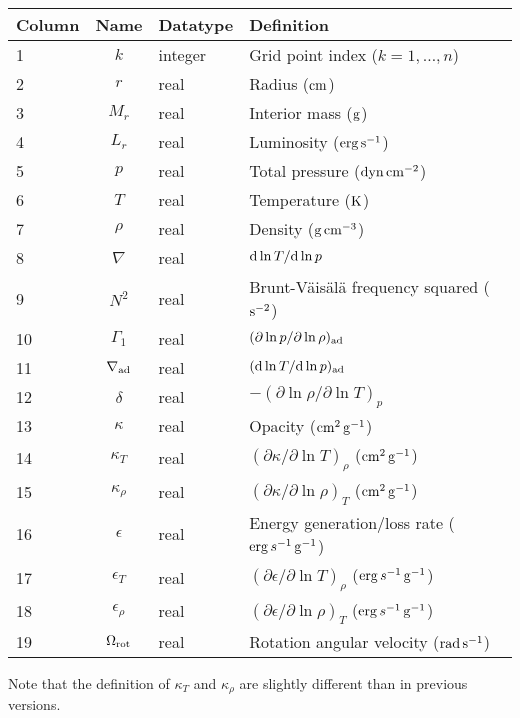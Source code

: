 \documentclass{article}
\newcommand{\diff}{\ensuremath{{\rm d}}}
\newcommand{\cm}{\ensuremath{{\rm cm}}}
\newcommand{\gram}{\ensuremath{{\rm g}}}
\newcommand{\second}{\ensuremath{{\rm s}}}
\newcommand{\dyne}{\ensuremath{{\rm dyn}}}
\newcommand{\erg}{\ensuremath{{\rm erg}}}
\newcommand{\kelvin}{\ensuremath{{\rm K}}}
\begin{document}
\begin{table}[h!]
\begin{tabular}{|l|c|l|l|} \hline
Column & Name & Datatype & Definition \\ \hline
1      & $k$ & integer & Grid point index ($k=1,\ldots,n$) \\
2      & $r$ & real    & Radius ($\cm$) \\
3      & $M_{r}$ & real  & Interior mass ($\gram$) \\
4      & $L_{r}$ & real & Luminosity ($\erg\,\second^{-1}$) \\
5      & $p$ & real    & Total pressure ($\dyne\,\cm^{-2}$) \\
6      & $T$ & real    & Temperature ($\kelvin$) \\
7      & $\rho$ & real & Density ($\gram\,\cm^{-3}$) \\
8      & $\nabla$ & real & $\diff \ln T/\diff \ln p$ \\
9      & $N^{2}$ & real & Brunt-V\"ais\"al\"a frequency squared ($\second^{-2}$) \\
10     & $\Gamma_{1}$ & real & $(\partial \ln p/\partial \ln \rho)_{\rm ad}$ \\
11     & $\nabla_{\rm ad}$ & real & $(\diff \ln T/\diff \ln p)_{\rm ad}$ \\
12     & $\delta$ & real & $-(\partial \ln \rho/\partial \ln T)_{p}$  \\
13     & $\kappa$ & real & Opacity ($\cm^{2}\,\gram^{-1}$) \\
14     & $\kappa_{T}$ & real & $(\partial \kappa/\partial \ln T)_{\rho}$ ($\cm^{2}\,\gram^{-1}$) \\
15     & $\kappa_{\rho}$ & real & $(\partial \kappa/\partial \ln \rho)_{T}$ ($\cm^{2}\,\gram^{-1}$) \\
16     & $\epsilon$ & real & Energy generation/loss rate ($\erg\,s^{-1}\,\gram^{-1}$) \\
17     & $\epsilon_{T}$ & real & $(\partial \epsilon/\partial \ln T)_{\rho}$ ($\erg\,s^{-1}\,\gram^{-1}$) \\
18     & $\epsilon_{\rho}$ & real & $(\partial \epsilon/\partial \ln \rho)_{T}$ ($\erg\,s^{-1}\,\gram^{-1}$) \\
19     & $\Omega_{\rm rot}$ & real & Rotation angular velocity (${\rm rad}\,\second^{-1}$) \\  \hline
\end{tabular}
\end{table}

Note that the definition of $\kappa_{T}$ and $\kappa_{\rho}$ are
slightly different than in previous versions.
\end{document}
